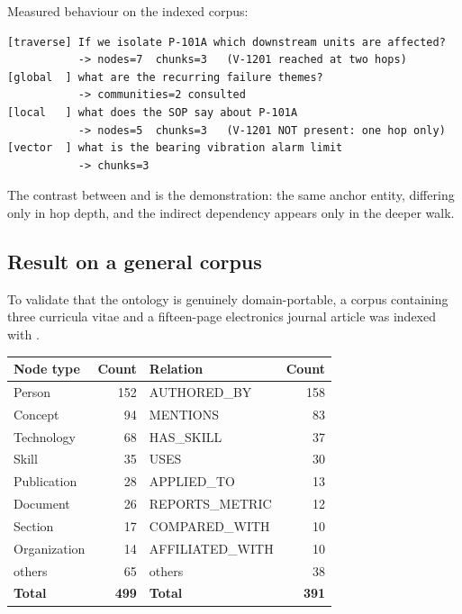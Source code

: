 Measured behaviour on the indexed corpus:

\begin{lstlisting}
[traverse] If we isolate P-101A which downstream units are affected?
           -> nodes=7  chunks=3   (V-1201 reached at two hops)
[global  ] what are the recurring failure themes?
           -> communities=2 consulted
[local   ] what does the SOP say about P-101A
           -> nodes=5  chunks=3   (V-1201 NOT present: one hop only)
[vector  ] what is the bearing vibration alarm limit
           -> chunks=3
\end{lstlisting}

The contrast between  and  is the demonstration: the
same anchor entity, differing only in hop depth, and the indirect dependency
appears only in the deeper walk.

\subsection{Result on a general corpus}

To validate that the ontology is genuinely domain-portable, a corpus containing
three curricula vitae and a fifteen-page electronics journal article was
indexed with .

\begin{center}
\renewcommand{\arraystretch}{1.15}
\begin{tabular}{@{}l r l r@{}}
\toprule
\textbf{Node type} & \textbf{Count} & \textbf{Relation} & \textbf{Count} \\
\midrule
Person & 152 & AUTHORED\_BY & 158 \\
Concept & 94 & MENTIONS & 83 \\
Technology & 68 & HAS\_SKILL & 37 \\
Skill & 35 & USES & 30 \\
Publication & 28 & APPLIED\_TO & 13 \\
Document & 26 & REPORTS\_METRIC & 12 \\
Section & 17 & COMPARED\_WITH & 10 \\
Organization & 14 & AFFILIATED\_WITH & 10 \\
others & 65 & others & 38 \\
\midrule
\textbf{Total} & \textbf{499} & \textbf{Total} & \textbf{391} \\
\bottomrule
\end{tabular}
\end{center}


